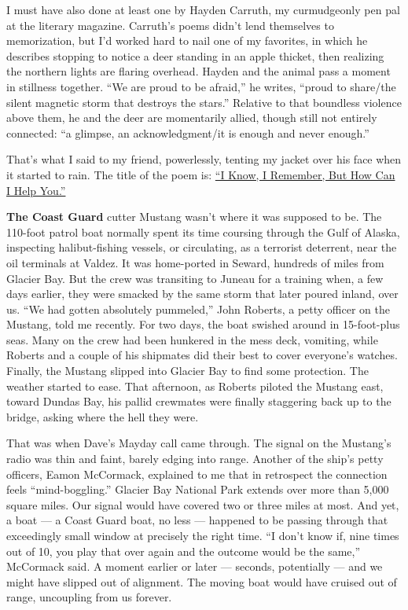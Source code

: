 I must have also done at least one by Hayden Carruth, my curmudgeonly
pen pal at the literary magazine. Carruth's poems didn't lend themselves
to memorization, but I'd worked hard to nail one of my favorites, in
which he describes stopping to notice a deer standing in an apple
thicket, then realizing the northern lights are flaring overhead. Hayden
and the animal pass a moment in stillness together. ``We are proud to be
afraid,'' he writes, ``proud to share/the silent magnetic storm that
destroys the stars.'' Relative to that boundless violence above them, he
and the deer are momentarily allied, though still not entirely
connected: ``a glimpse, an acknowledgment/it is enough and never
enough.''

That's what I said to my friend, powerlessly, tenting my jacket over his
face when it started to rain. The title of the poem is:
\href{https://www.poetryfoundation.org/poems/42586/i-know-i-remember-but-how-can-i-help-you}{``I
Know, I Remember, But How Can I Help You.''}

\textbf{The Coast Guard} cutter Mustang wasn't where it was supposed to
be. The 110-foot patrol boat normally spent its time coursing through
the Gulf of Alaska, inspecting halibut-fishing vessels, or circulating,
as a terrorist deterrent, near the oil terminals at Valdez. It was
home-ported in Seward, hundreds of miles from Glacier Bay. But the crew
was transiting to Juneau for a training when, a few days earlier, they
were smacked by the same storm that later poured inland, over us. ``We
had gotten absolutely pummeled,'' John Roberts, a petty officer on the
Mustang, told me recently. For two days, the boat swished around in
15-foot-plus seas. Many on the crew had been hunkered in the mess deck,
vomiting, while Roberts and a couple of his shipmates did their best to
cover everyone's watches. Finally, the Mustang slipped into Glacier Bay
to find some protection. The weather started to ease. That afternoon, as
Roberts piloted the Mustang east, toward Dundas Bay, his pallid
crewmates were finally staggering back up to the bridge, asking where
the hell they were.

That was when Dave's Mayday call came through. The signal on the
Mustang's radio was thin and faint, barely edging into range. Another of
the ship's petty officers, Eamon McCormack, explained to me that in
retrospect the connection feels ``mind-boggling.'' Glacier Bay National
Park extends over more than 5,000 square miles. Our signal would have
covered two or three miles at most. And yet, a boat --- a Coast Guard
boat, no less --- happened to be passing through that exceedingly small
window at precisely the right time. ``I don't know if, nine times out of
10, you play that over again and the outcome would be the same,''
McCormack said. A moment earlier or later --- seconds, potentially ---
and we might have slipped out of alignment. The moving boat would have
cruised out of range, uncoupling from us forever.

